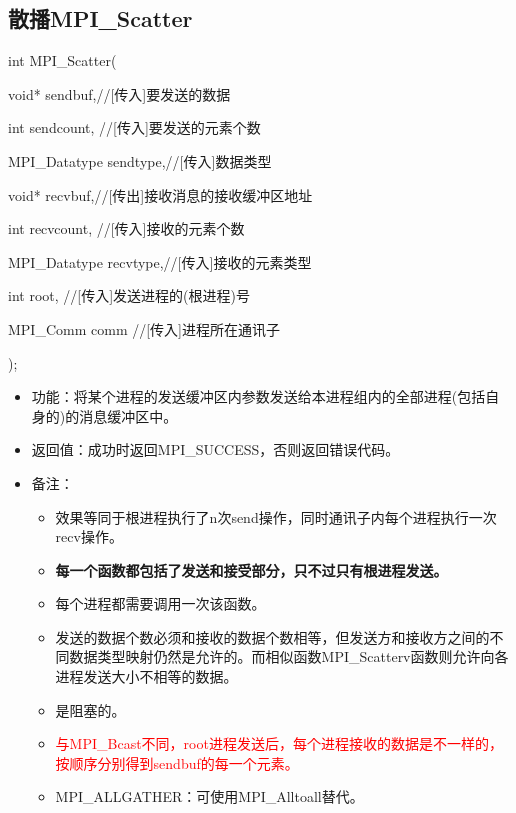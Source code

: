 \documentclass[UTF8]{article}%
\begin{document}
\subsection{散播MPI\_Scatter}

int MPI\_Scatter(
    
    \qquad void* sendbuf,//[传入]要发送的数据

    \qquad int sendcount, //[传入]要发送的元素个数

    \qquad MPI\_Datatype sendtype,//[传入]数据类型

    \qquad void* recvbuf,//[传出]接收消息的接收缓冲区地址

    \qquad int recvcount, //[传入]接收的元素个数

    \qquad MPI\_Datatype recvtype,//[传入]接收的元素类型
                
    \qquad int root, //[传入]发送进程的(根进程)号
    
    \qquad MPI\_Comm comm //[传入]进程所在通讯子
    
);

\begin{itemize}
    \item 功能：将某个进程的发送缓冲区内参数发送给本进程组内的全部进程(包括自身的)的消息缓冲区中。
    \item 返回值：成功时返回MPI\_SUCCESS，否则返回错误代码。
    \item 备注：
    
    {
        \begin{itemize}
            \item 效果等同于根进程执行了n次send操作，同时通讯子内每个进程执行一次recv操作。
            \item \textbf{每一个函数都包括了发送和接受部分，只不过只有根进程发送。}
            \item 每个进程都需要调用一次该函数。
            \item 发送的数据个数必须和接收的数据个数相等，但发送方和接收方之间的不同数据类型映射仍然是允许的。而相似函数MPI\_Scatterv函数则允许向各进程发送大小不相等的数据。
            \item 是阻塞的。
            \item \textcolor{red}{与MPI\_Bcast不同，root进程发送后，每个进程接收的数据是不一样的，按顺序分别得到sendbuf的每一个元素。}
            \item MPI\_ALLGATHER：可使用MPI\_Alltoall替代。
        \end{itemize}
    }

\end{itemize}
\end{document}
